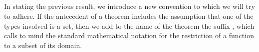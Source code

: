 \begin{code}
\AgdaSymbol{)}\AgdaSpace{}%
\AgdaFunction{,}\AgdaSpace{}%
\AgdaSymbol{(}\AgdaSpace{}%
\AgdaSpace{}%
\AgdaSpace{}%
\AgdaSpace{}%
\AgdaSpace{}%
\AgdaSpace{}%
\AgdaSpace{}%
\AgdaSymbol{)}\AgdaSpace{}%
\AgdaSpace{}%
\AgdaSymbol{)}\AgdaSpace{}%
\AgdaSpace{}%
\<%
\\
%
\>[2]\AgdaSpace{}%
\AgdaSymbol{=}\AgdaSpace{}%
\AgdaSpace{}%
\AgdaOperator{\AgdaInductiveConstructor{,}}\AgdaSpace{}%
\AgdaSpace{}%
\AgdaSymbol{(}\AgdaSpace{}%
\AgdaSymbol{)}\AgdaSpace{}%
\AgdaSpace{}%
\AgdaSymbol{(}\AgdaSpace{}%
\AgdaSpace{}%
\AgdaSpace{}%
\AgdaSpace{}%
\AgdaSpace{}%
\AgdaSpace{}%
\AgdaSpace{}%
\AgdaSymbol{)}\AgdaSpace{}%
\AgdaSpace{}%
\AgdaSymbol{)}\AgdaSpace{}%
\<%
\\
%
\\[\AgdaEmptyExtraSkip]%
%
\>[2]\AgdaSpace{}%
\AgdaSymbol{:}\AgdaSpace{}%
\AgdaSpace{}%
\AgdaOperator{\AgdaInductiveConstructor{,}}\AgdaSpace{}%
\AgdaSpace{}%
\AgdaSpace{}%
\AgdaSpace{}%
\AgdaOperator{\AgdaInductiveConstructor{,}}\AgdaSpace{}%
\<%
\\
%
\>[2]\AgdaSpace{}%
\AgdaSymbol{=}\AgdaSpace{}%
\AgdaSpace{}%
\<%
\end{code}
\ccpad
In stating the previous result, we introduce a new convention to which we will try to adhere. If the antecedent of a theorem includes the assumption that one of the types involved is a set, then we add to the name of the theorem the suffix , which calls to mind the standard mathematical notation for the restriction of a function to a subset of its domain.

